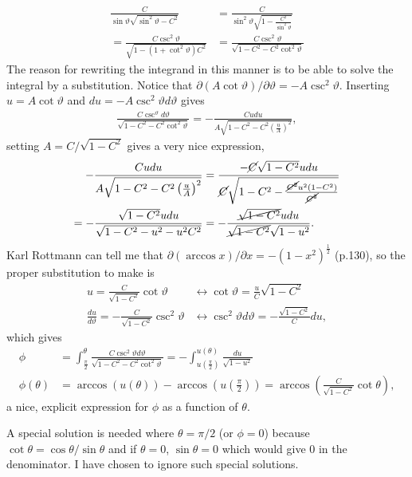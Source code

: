 \documentclass[11pt]{amsart}
\begin{document}
\begin{align*}
\frac{C}{\sin\vartheta\sqrt{\sin^2\vartheta-C^2}} &= \frac{C}{\sin^2\vartheta\sqrt{1 - \frac{C^2}{\sin^2\vartheta}}} \\
= \frac{C\csc^2\vartheta}{\sqrt{1-(1+\cot^2\vartheta)C^2}} &= \frac{C\csc^2\vartheta}{\sqrt{1-C^2-C^2\cot^2\vartheta}}
\end{align*}
The reason for rewriting the integrand in this manner is to be able to solve the integral by a substitution. Notice that $\partial (A \cot\vartheta) / \partial \vartheta = -A \csc^2\vartheta$. Inserting $u= A\cot\vartheta$ and $du = -A\csc^2\vartheta d\vartheta$ gives
\begin{align*}
\frac{C\csc^\vartheta d\vartheta}{\sqrt{1-C^2-C^2\cot^2\vartheta}}
= -\frac{C udu}{A\sqrt{1- C^2 - C^2\left(\frac{u}{A} \right)^2}},
\end{align*}
setting $A = C/\sqrt{1-C^2}$ gives a very nice expression,
\begin{align*}
-\frac{C udu}{A\sqrt{1- C^2 - C^2\left(\frac{u}{A} \right)^2}} 
&= \frac{-\cancel{C}\sqrt{1-C^2} udu}{\cancel{C} \sqrt{1-C^2-\frac{\cancel{C^2}u^2(1-C^2)}{\cancel{C^2}}}} \\
= -\frac{\sqrt{1-C^2}udu}{\sqrt{1-C^2-u^2-u^2C^2}} &= -\frac{\cancel{\sqrt{1-C^2}}udu}{\cancel{\sqrt{1-C^2}}\sqrt{1-u^2}}.
\end{align*}
Karl Rottmann can tell me that $\partial(\arccos x)/\partial x = -(1-x^2)^{\frac{1}{2}}$ (p.130), so the proper substitution to make is
\begin{align*}
u = \frac{C}{\sqrt{1-C^2}}\cot\vartheta &\leftrightarrow \cot\vartheta = \frac{u}{C}\sqrt{1-C^2} \\
\frac{du}{d\vartheta} = -\frac{C}{\sqrt{1-C^2}}\csc^2\vartheta &\leftrightarrow \csc^2\vartheta d\vartheta = -\frac{\sqrt{1-C^2}}{C}du,
\end{align*}
which gives
\begin{align}
\phi &= \int_{\frac{\pi}{2}}^{\theta} \frac{C\csc^2\vartheta d\vartheta}{\sqrt{1-C^2-C^2\cot^2\vartheta}} = -\int_{u(\frac{\pi}{2})}^{u(\theta)} \frac{du}{\sqrt{1-u^2}}	\nonumber \\
\phi(\theta) &= \arccos(u(\theta)) - \arccos(u(\frac{\pi}{2})) = \arccos(\frac{C}{\sqrt{1-C^2}}\cot\theta),
\end{align}
a nice, explicit expression for $\phi$ as a function of $\theta$. 

A special solution is needed where $\theta = \pi/2$ (or $\phi = 0$) because $\cot\theta = \cos\theta / \sin\theta$ and if $\theta = 0$, $\sin\theta = 0$ which would give $0$ in the denominator. I have chosen to ignore such special solutions.
\end{document}
